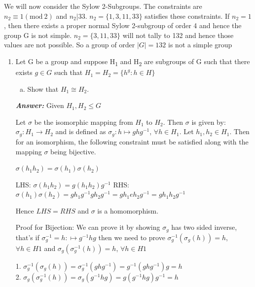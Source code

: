 \documentclass[11pt,a4paper]{article}
\begin{document}
\begin{flushleft}
\begin{enumerate}[(a)]
			We will now consider the Sylow 2-Subgroups. The constraints are $n_2 \equiv 1(\textrm{mod}\ 2)$ and $n_2|33$. $n_2 = \{1, 3, 11, 33\}$ satisfies these constraints. If $n_2 = 1$, then there exists a proper normal Sylow 2-subgroup of order 4 and hence the group G is not simple. $n_2 = \{3, 11, 33\}$ will not tally to 132 and hence those values are not possible. So a group of order $|G| = 132$ is not a simple group
		\end{enumerate}
	\end{flushleft}
	
	\begin{enumerate}[4.]
		\item Let G be a group and suppose H\textsubscript{1} and H\textsubscript{2} are subgroups of G such that there exists $g \in G$ such that $H_1 = H_2 = \{h^g : h \in H\}$
		\begin{enumerate}[(a)]
			\item Show that $H_1 \cong H_2 $.
		\end{enumerate}
		\begin{flushleft}
			\textbf{\textit{Answer:}}
			Given $H_1, H_2 \le G$ 
			
			Let $\sigma$ be the isomorphic mapping from $H_1$ to $H_2$. Then $\sigma$ is given by:
			$\sigma_g: H_1 \to H_2$ and is defined as $\sigma_g: h \mapsto ghg^{-1}$, $\forall h \in H_1$. Let $h_1, h_2 \in H_1$. Then for an isomorphism, the following constraint must be satisfied along with the mapping $\sigma$ being bijective.
			
			$\sigma(h_1h_2) = \sigma(h_1)\sigma(h_2)$
			
			LHS: $\sigma(h_1h_2) = g(h_1h_2)g^{-1}$
			RHS: $\sigma(h_1)\sigma(h_2) = gh_1g^{-1}gh_2g^{-1} = gh_1eh_2g^{-1} = gh_1h_2g^{-1}$
			
			Hence $LHS = RHS$ and $\sigma$ is a homomorphism.
			
			Proof for Bijection: We can prove it by showing $\sigma_g$ has two sided inverse, that's if $\sigma_g^{-1} = h: \mapsto g^{-1}hg$ then we need to prove $\sigma_g^{-1}(\sigma_g(h)) = h$, $\forall h \in H1$ and $\sigma_g(\sigma_g^{-1}(h)) = h$, $\forall h \in H1$
			
			1. $\sigma_g^{-1}(\sigma_g(h)) = \sigma_g^{-1}(ghg^{-1}) = g^{-1}(ghg^{-1})g = h$\\
			2. $\sigma_g(\sigma_g^{-1}(h)) = \sigma_g(g^{-1}hg) = g(g^{-1}hg)g^{-1} = h$
			

\end{flushleft}
\end{enumerate}
\end{document}
